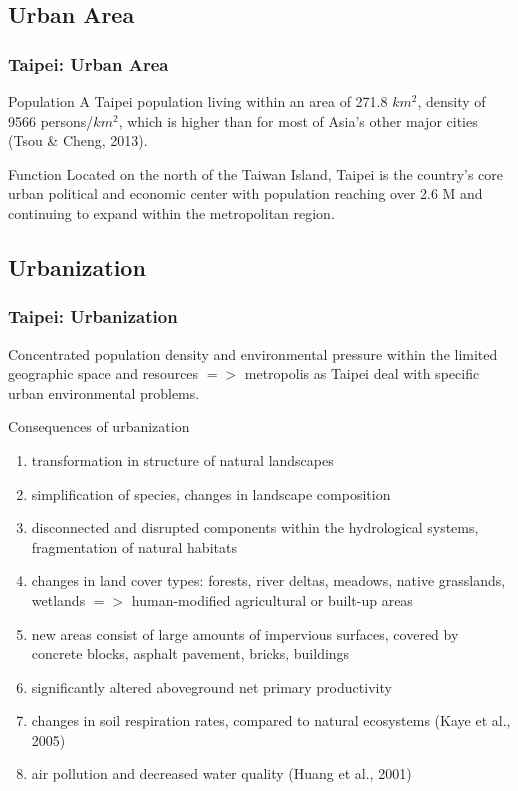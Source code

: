 \documentclass[pdflatex,compress,8pt,
	xcolor={dvipsnames,dvipsnames,svgnames,x11names,table},
	hyperref={colorlinks = true,breaklinks = true, urlcolor = NavyBlue, breaklinks = true}]{beamer}
\begin{document}
\subsection{Urban Area}
\begin{frame}\frametitle{Taipei: Urban Area}
\begin{figure}[H]
	\centering
			\hspace{5mm}
\end{figure}

\begin{alertblock}{Population}
A Taipei population living within an area of 271.8 $km^{2}$, density of 9566 persons/$km^{2}$, which is higher than for most of Asia’s other major cities (Tsou \& Cheng, 2013).
\end{alertblock}

\begin{block}{Function}
Located on the north of the Taiwan Island, Taipei is the country's core urban \alert{political and economic center} with population reaching over 2.6 M and continuing to expand within the metropolitan region.
\end{block}

\end{frame}

\subsection{Urbanization}
\begin{frame}\frametitle{Taipei: Urbanization}
Concentrated \alert{population density} and \alert{environmental pressure} within the \alert{limited geographic space and resources} $=>$ metropolis as Taipei deal with specific urban environmental problems.
\begin{examples}{Consequences of urbanization}
\begin{enumerate}
	\item transformation in \alert{structure of natural landscapes}
	\item simplification of species, changes in landscape composition
	\item disconnected and disrupted components within the hydrological systems, fragmentation of natural habitats
	\item changes in \alert{land cover types}: forests, river deltas, meadows, native grasslands, wetlands $=>$ human-modified agricultural or \alert{built-up areas} 
	\item new areas consist of large amounts of \alert{impervious surfaces}, covered by concrete blocks, asphalt pavement, bricks, buildings
	\item significantly altered \alert{aboveground net primary productivity}
	\item changes in \alert{soil respiration rates}, compared to natural ecosystems (Kaye et al., 2005)
	\item \alert{air pollution} and decreased \alert{water quality} (Huang et al., 2001)
\end{enumerate}
\end{examples}
\end{frame}
\end{document}
